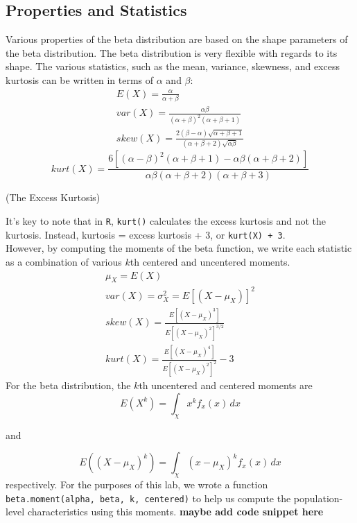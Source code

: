 \documentclass{article}\usepackage[]{graphicx}\usepackage[]{xcolor}
\begin{document}
\begin{multicols}{2}
\section{Properties and Statistics}
Various properties of the beta distribution are based on the shape parameters of the beta distribution. The beta distribution is very flexible with regards to its shape. The various statistics, such as the mean, variance, skewness, and excess kurtosis can be written in terms of $\alpha$ and $\beta$: 
 \begin{align*}
 E(X) = \frac{\alpha}{\alpha + \beta} \tag{The Mean}\\
var(X) = \frac{\alpha\beta}{(\alpha + \beta)^2(\alpha + \beta + 1)} \tag{The Variance} \\
skew(X) = \frac{2(\beta - \alpha)\sqrt{\alpha + \beta + 1}}{(\alpha + \beta + 2)\sqrt{\alpha\beta}} \tag{The Skewness}
 \end{align*}
 \[kurt(X) = \frac{6[(\alpha - \beta)^2(\alpha + \beta + 1) - \alpha\beta(\alpha + \beta + 2)]}{\alpha\beta(\alpha + \beta + 2)(\alpha + \beta + 3)}\]
\begin{flushright}
(The Excess Kurtosis)
\end{flushright}
It's key to note that in \texttt{R}, \verb|kurt()| calculates the excess kurtosis and not the kurtosis. Instead, kurtosis = excess kurtosis + 3, or \verb|kurt(X) + 3|. \\
\indent However, by computing the moments of the beta function, we write each statistic as a combination of various $k$th centered and uncentered moments. 
\begin{align*}
 \mu_X = E(X) \tag{The Mean}\\
 var(X) = \sigma^2_X = E[(X-\mu_X)]^2 \tag{The Variance}\\
 skew(X) = \frac{E[(X - \mu_X)^3]}{E[(X-\mu_X)^2]^{3/2}} \tag{The Skewness}\\
 kurt(X) = \frac{E[(X-\mu_X)^4]}{E[(X-\mu_X)^2]^2} - 3 \tag{The Excess Kurtsosis}
\end{align*}
For the beta distribution, the $k$th uncentered and centered moments are
\[E(X^{k}) = \int_{\chi}^{} x^{k}f_x(x) \,dx \]
\begin{center}
and 
\end{center}
\[E((X-\mu_X)^{k}) = \int_{\chi}^{} (x-\mu_X)^{k}f_x(x) \,dx \]
respectively. For the purposes of this lab, we wrote a function \verb|beta.moment(alpha, beta, k, centered)| to help us compute the population-level characteristics using this moments. \textbf{maybe add code snippet here} \\


\end{multicols}
\end{document}
